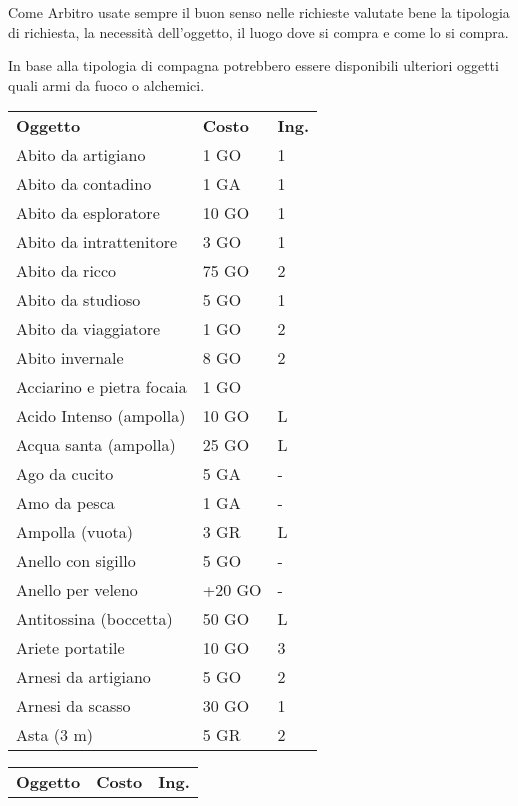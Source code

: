 \documentclass[12pt,a4paper,twoside,openany]{book}
\begin{document}
\begin{multicols}{2}
Come Arbitro usate sempre il buon senso nelle richieste valutate bene la tipologia di richiesta, la necessità dell'oggetto, il luogo dove si compra e come lo si compra.

In base alla tipologia di compagna potrebbero essere disponibili ulteriori oggetti quali armi da fuoco o alchemici.

{\small
\begin{tabularx}{0.42\textwidth}{lll}
\textbf{Oggetto}    & \textbf{Costo} & \textbf{Ing.}\\
Abito da artigiano& 1 GO& 1\\
Abito da contadino& 1 GA& 1\\
Abito da esploratore  & 10 GO& 1\\
Abito da intrattenitore & 3 GO& 1\\
Abito da ricco & 75 GO  & 2\\
Abito da studioso & 5 GO& 1\\
Abito da viaggiatore  & 1 GO& 2\\
Abito invernale & 8 GO& 2\\
Acciarino e pietra focaia & 1 GO&\\
Acido Intenso (ampolla) & 10 GO  & L \\
Acqua santa (ampolla) & 25 GO& L\\
Ago da cucito & 5 GA &- \\
Amo da pesca  & 1 GA& - \\
Ampolla (vuota)& 3 GR& L \\
Anello con sigillo  & 5 GO& - \\
Anello per veleno & +20 GO&-\\
Antitossina (boccetta)  & 50 GO  & L\\
Ariete portatile  & 10 GO& 3 \\
Arnesi da artigiano& 5 GO& 2\\
Arnesi da scasso  & 30 GO& 1\\
Asta (3 m)  & 5 GR& 2\\
\end{tabularx}

\begin{tabularx}{0.42\textwidth}{lll}
\textbf{Oggetto}   & \textbf{Costo} & \textbf{Ing.}\\


\end{tabularx}}
\end{multicols}
\end{document}
